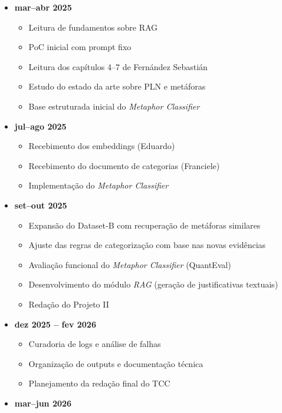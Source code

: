\begin{itemize}
\tightlist
\item
  \textbf{mar--abr 2025}

  \begin{itemize}
  \tightlist
  \item
    Leitura de fundamentos sobre RAG
  \item
    PoC inicial com prompt fixo
  \item
    Leitura dos capítulos 4--7 de Fernández Sebastián
  \item
    Estudo do estado da arte sobre PLN e metáforas
  \item
    Base estruturada inicial do \emph{Metaphor Classifier}
  \end{itemize}
\item
  \textbf{jul--ago 2025}

  \begin{itemize}
  \tightlist
  \item
    Recebimento dos embeddings (Eduardo)
  \item
    Recebimento do documento de categorias (Franciele)
  \item
    Implementação do \emph{Metaphor Classifier}
  \end{itemize}
\item
  \textbf{set--out 2025}

  \begin{itemize}
  \tightlist
  \item
    Expansão do Dataset-B com recuperação de metáforas similares
  \item
    Ajuste das regras de categorização com base nas novas evidências
  \item
    Avaliação funcional do \emph{Metaphor Classifier} (QuantEval)
  \item
    Desenvolvimento do módulo \emph{RAG} (geração de justificativas
    textuais)
  \item
    Redação do Projeto II
  \end{itemize}
\item
  \textbf{dez 2025 -- fev 2026}

  \begin{itemize}
  \tightlist
  \item
    Curadoria de logs e análise de falhas
  \item
    Organização de outputs e documentação técnica
  \item
    Planejamento da redação final do TCC
  \end{itemize}
\item
  \textbf{mar--jun 2026}


\end{itemize}
